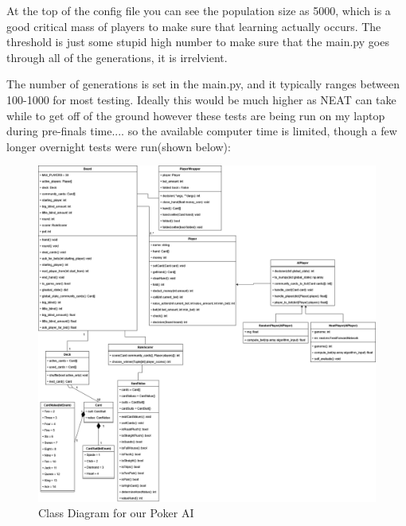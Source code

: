 At the top of the config file you can see the population size as 5000, which is a good critical mass of players
to make sure that learning actually occurs. The threshold is just some stupid high number to make sure that the
main.py goes through all of the generations, it is irrelvient.

The number of generations is set in the main.py, and it typically ranges between 100-1000 for most testing.
Ideally this would be much higher as NEAT can take while to get off of the ground however these tests are being
run on my laptop during pre-finals time.... so the available computer time is limited, though a few longer
overnight tests were run(shown below): 


\clearpage
\begin{figure}[H]
    \centering
    \includegraphics[scale=0.4]{resources/Poker_AI_-Class_Diagram.drawio.png}
    \caption{Class Diagram for our Poker AI}
    \label{fig:classDiagram}
\end{figure}



